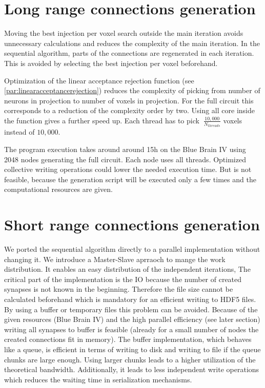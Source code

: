 \section{Long range connections generation}
Moving the best injection per voxel search outside the main iteration
avoids unnecessary calculations and reduces the complexity of the main iteration.
In the sequential algorithm, parts of the connections are regenerated in each iteration.
This is avoided by selecting the best injection per voxel beforehand.


Optimization of the linear acceptance rejection function (see \ref{par:linearacceptancerejection})
reduces the complexity of picking from number of neurons in projection to number of voxels in projection.
For the full circuit this corresponds to a reduction of the complexity order  by two.
Using all core inside the function gives a further speed up.
Each thread has to pick $~\frac{10,000}{N_{threads}}$ voxels instead of
$10,000$.

The program execution takes around around 15h on the Blue Brain IV using 2048 nodes generating the full circuit.
Each node uses all threads. Optimized collective writing operations could 
lower the needed execution time.
But is not feasible, because the generation script will be executed only a few times
and the computational resources are given.



\section{Short range connections generation}
We ported the sequential algorithm directly to a parallel implementation without changing it.
We introduce a Master-Slave aprraoch to mange the work distribution.
It enables an easy distribution of the independent iterations,
The critical part of the implementation is the IO because the number of created synapses is not known in the beginning.
Therefore the file size cannot be calculated beforehand which is mandatory for an efficient writing to HDF5 files. 
By using a buffer or temporary files this problem can be avoided.
Because of the given resources (Blue Brain IV) and the high parallel efficiency (see later section)
writing all synapses to buffer is feasible (already for a small number of nodes the created connections fit in memory).
The buffer implementation, which behaves like a queue, is efficient in terms of writing to disk and writing to file
if the queue chunks are large enough. Using larger chunks leads to 
a higher utilization of the theoretical bandwidth. Additionally, it leads to less independent
write operations which reduces the waiting time in serialization mechanisms.

